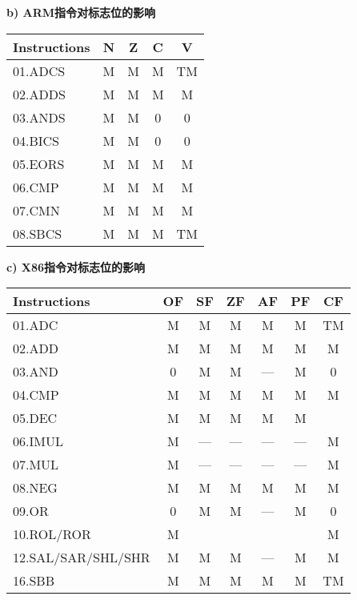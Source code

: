 \begin{table}[!htbp]
\begin{minipage}{0.4\textwidth}
        \textbf{b) ARM指令对标志位的影响} \\
        \vspace{0.2cm}
        \begin{tabular}{lcccc}
            \hline
            Instructions & N & Z & C & V \\
            \hline
            01.ADCS & M & M & M & TM \\
            02.ADDS & M & M & M & M \\
            03.ANDS & M & M & 0 & 0 \\
            04.BICS & M & M & 0 & 0 \\
            05.EORS & M & M & M & M \\
            06.CMP & M & M & M & M \\
            07.CMN & M & M & M & M \\
            08.SBCS & M & M & M & TM \\
            \hline
        \end{tabular}
    \end{minipage}%
    \hfill %
    \begin{minipage}{0.6\textwidth} %
        \centering
        \textbf{c) X86指令对标志位的影响} \\
        \vspace{0.2cm} %
        \begin{tabular}{lcccccc}
            \hline
            Instructions & OF & SF & ZF & AF & PF & CF \\
            \hline
            01.ADC & M & M & M & M & M & TM \\
            02.ADD & M & M & M & M & M & M \\
            03.AND & 0 & M & M & --- & M & 0 \\
            04.CMP & M & M & M & M & M & M \\
            05.DEC & M & M & M & M & M &  \\
            06.IMUL & M & --- & --- & --- & --- & M \\
            07.MUL & M & --- & --- & --- & --- & M \\
            08.NEG & M & M & M & M & M & M \\
            09.OR & 0 & M & M & --- & M & 0 \\
            10.ROL/ROR & M &  &  &  &  & M \\
            12.SAL/SAR/SHL/SHR & M & M & M & --- & M & M \\
            16.SBB & M & M & M & M & M & TM \\
            \hline
        \end{tabular}
    \end{minipage}
\end{table}

